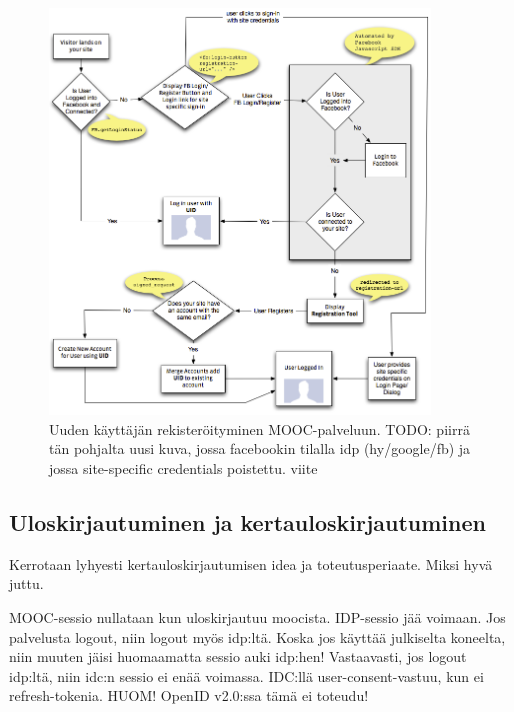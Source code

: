 \documentclass[finnish,gradu]{tktltiki}
\begin{document}
  \begin{figure}
    \centering
    \includegraphics[width=0.9\textwidth]{images/facebook_user_registretion.png}
    \caption{Uuden käyttäjän rekisteröityminen MOOC-palveluun. TODO: piirrä tän pohjalta uusi kuva, jossa facebookin tilalla idp (hy/google/fb) ja jossa site-specific credentials poistettu. viite }
    \label{fig:registration_with_facebook}
  \end{figure}



  \subsection{Uloskirjautuminen ja kertauloskirjautuminen} %
  \label{sub:kertauloskirjautuminen}
  Kerrotaan lyhyesti kertauloskirjautumisen idea ja toteutusperiaate. Miksi hyvä juttu.

  MOOC-sessio nullataan kun uloskirjautuu moocista. IDP-sessio jää voimaan. Jos palvelusta logout, niin logout myös idp:ltä. Koska jos käyttää julkiselta koneelta, niin muuten jäisi huomaamatta sessio auki idp:hen! Vastaavasti, jos logout idp:ltä, niin idc:n sessio ei enää voimassa. IDC:llä user-consent-vastuu, kun ei refresh-tokenia. HUOM! OpenID v2.0:ssa tämä ei toteudu!
\end{document}
